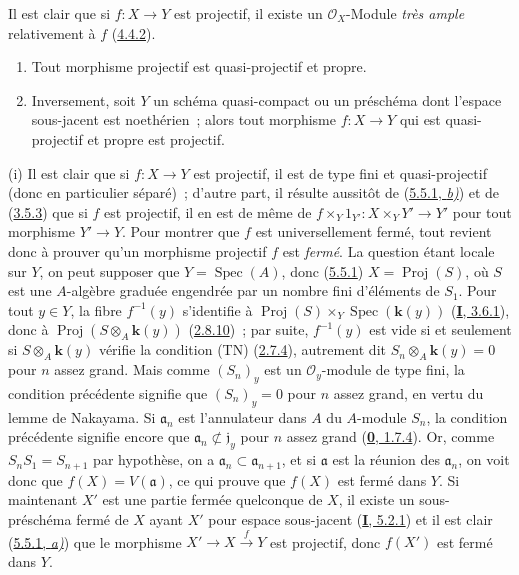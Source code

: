 Il est clair que si $f:X\to Y$ est projectif, il existe un
$\mathcal{O}_X$-Module \emph{très ample} relativement à $f$
(\hyperref[II.4.4.2-fr]{4.4.2}).

\begin{theorem}[5.5.3]
\label{II.5.5.3-fr}
\begin{enumerate}
  \item[\rm{(i)}] Tout morphisme projectif est quasi-projectif et propre.
  \item[\rm{(ii)}] Inversement, soit $Y$ un schéma quasi-compact ou un
  préschéma dont l'espace sous-jacent est noethérien~; alors tout morphisme
  $f:X\to Y$ qui est quasi-projectif et propre est projectif.
\end{enumerate}
\end{theorem}

(i) Il est clair que si $f:X\to Y$ est projectif, il est de type fini et
quasi-projectif (donc en particulier séparé)~; d'autre part, il résulte
aussitôt de (\hyperref[II.5.5.1-fr]{5.5.1, \emph{b)}}) et de
(\hyperref[II.3.5.3-fr]{3.5.3}) que si $f$ est projectif, il en est de même de
$f\times_Y1_{Y'}:X\times_YY'\to Y'$ pour tout morphisme $Y'\to Y$. Pour
montrer que $f$ est universellement fermé, tout revient donc à prouver qu'un
morphisme projectif $f$ est \emph{fermé}. La question étant locale sur $Y$, on
peut supposer que $Y=\operatorname{Spec}(A)$, donc
(\hyperref[II.5.5.1-fr]{5.5.1}) $X=\operatorname{Proj}(S)$, où $S$ est une
$A$-algèbre graduée engendrée par un nombre fini d'éléments de $S_1$. Pour
tout $y\in Y$, la fibre $f^{-1}(y)$ s'identifie à
$\operatorname{Proj}(S)\times_Y\operatorname{Spec}(\boldsymbol{k}(y))$
(\hyperref[I.3.6.1-fr]{\textbf{I}, 3.6.1}), donc à
$\operatorname{Proj}(S\otimes_A\boldsymbol{k}(y))$
(\hyperref[II.2.8.10-fr]{2.8.10})~; par suite, $f^{-1}(y)$ est vide si et
seulement si $S\otimes_A\boldsymbol{k}(y)$ vérifie la condition (TN)
(\hyperref[II.2.7.4-fr]{2.7.4}), autrement dit $S_n\otimes_A\boldsymbol{k}(y)=0$ pour $n$
assez grand. Mais comme $(S_n)_y$ est un $\mathcal{O}_y$-module de type fini,
la condition précédente signifie que $(S_n)_y=0$ pour $n$ assez grand, en
vertu du lemme de Nakayama. Si $\mathfrak a_n$ est l'annulateur dans $A$ du
$A$-module $S_n$, la condition précédente signifie encore que
$\mathfrak a_n\not\subset\mathfrak j_y$ pour $n$ assez grand
(\hyperref[0.1.7.4-fr]{\textbf{0}, 1.7.4}). Or, comme $S_nS_1=S_{n+1}$ par hypothèse,
on a $\mathfrak a_n\subset\mathfrak a_{n+1}$, et si $\mathfrak a$ est la
réunion des $\mathfrak a_n$, on voit donc que $f(X)=V(\mathfrak a)$, ce qui
prouve que $f(X)$ est fermé dans $Y$. Si maintenant $X'$ est une partie
fermée quelconque de $X$, il existe un sous-préschéma fermé de $X$ ayant $X'$
pour espace sous-jacent (\hyperref[I.5.2.1-fr]{\textbf{I}, 5.2.1}) et il est clair
(\hyperref[II.5.5.1-fr]{5.5.1, \emph{a)}}) que le morphisme
$X'\to X\xrightarrow{f}Y$ est projectif, donc $f(X')$ est fermé dans $Y$.

